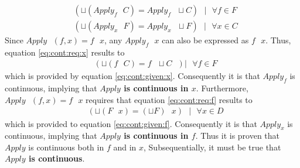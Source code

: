 \begin{align}
	& ( \sqcup ( Apply_f \text{ } C ) = Apply_f \text{ } \sqcup C ) \text{ } | \text{ } \forall f \in F \label{eq:cont:req:x} \\
	& ( \sqcup ( Apply_x \text{ } F ) = Apply_x \text{ } \sqcup F ) \text{ } | \text{ } \forall x \in C \label{eq:cont:req:f}
\end{align}
Since $Apply \text{ } (f,x) = f \text{ } x$, any $Apply_f \text{ } x$ can also be expressed as $f \text{ } x$. Thus, equation \ref{eq:cont:req:x} results to
\begin{align}
	& ( \sqcup ( f \text{ } C ) = f \text{ } \sqcup C \text{ } ) | \text{ } \forall f \in F
\end{align}
which is provided by equation \ref{eq:cont:given:x}. Consequently it is that $Apply_f$ is continuous, implying that	\textbf{$Apply$ is continuous in $x$}. 
Furthermore, $Apply \text{ } (f,x) = f \text{ } x$ requires that equation \ref{eq:cont:req:f} results to
\begin{align}
	& ( \sqcup ( F \text{ } x ) = (\sqcup F) \text{ } x ) \text{ } | \text{ } \forall x \in D
\end{align}
which is provided to equation \ref{eq:cont:given:f}. Consequently it is that $Apply_x$ is continuous, implying that	\textbf{$Apply$ is continuous in $f$}. 
Thus it is proven that $Apply$ is continuous both in $f$ and in $x$, Subsequentially, it must be true that \textbf{$Apply$ is continuous}.